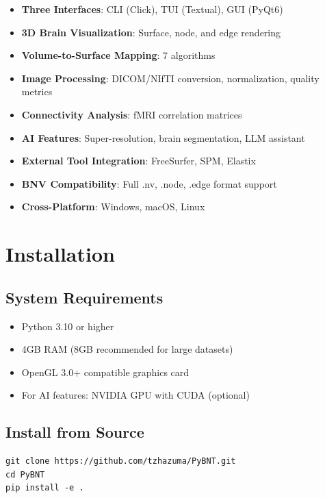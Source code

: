 \documentclass[11pt,a4paper]{article}
\begin{document}
\begin{itemize}
    \item \textbf{Three Interfaces}: CLI (Click), TUI (Textual), GUI (PyQt6)
    \item \textbf{3D Brain Visualization}: Surface, node, and edge rendering
    \item \textbf{Volume-to-Surface Mapping}: 7 algorithms
    \item \textbf{Image Processing}: DICOM/NIfTI conversion, normalization, quality metrics
    \item \textbf{Connectivity Analysis}: fMRI correlation matrices
    \item \textbf{AI Features}: Super-resolution, brain segmentation, LLM assistant
    \item \textbf{External Tool Integration}: FreeSurfer, SPM, Elastix
    \item \textbf{BNV Compatibility}: Full .nv, .node, .edge format support
    \item \textbf{Cross-Platform}: Windows, macOS, Linux
\end{itemize}

\section{Installation}

\subsection{System Requirements}

\begin{itemize}
    \item Python 3.10 or higher
    \item 4GB RAM (8GB recommended for large datasets)
    \item OpenGL 3.0+ compatible graphics card
    \item For AI features: NVIDIA GPU with CUDA (optional)
\end{itemize}

\subsection{Install from Source}

\begin{lstlisting}[caption=Installation from source]
git clone https://github.com/tzhazuma/PyBNT.git
cd PyBNT
pip install -e .
\end{lstlisting}
\end{document}
